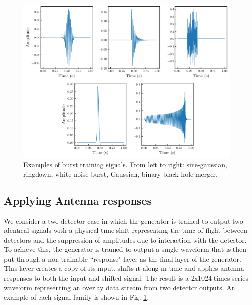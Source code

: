 \documentclass[12pt]{iopart}
\begin{document}
\begin{figure}
    \centering
    \includegraphics[scale=0.7]{figures/training.pdf}
    \caption{Examples of burst training signals. From left to right: sine-gaussian, ringdown, white-noise burst, Gaussian, binary-black hole merger.}
    \label{fig:train}
\end{figure}

\subsection{Applying Antenna responses}
We consider a two detector case in which the generator is trained to output two identical signals with a physical time shift representing the time of flight between detectors and the suppression of amplitudes due to interaction with the detector. To achieve this, the generator is trained to output a single waveform that is then put through a non-trainable ``response" layer as the final layer of the generator. This layer creates a copy of its input, shifts it along in time and applies antenna responses to both the input and shifted signal. The result is a 2x1024 times series waveform representing an overlay data stream from two detector outputs. An example of each signal family is shown in Fig. \ref{fig:train}.
\end{document}
